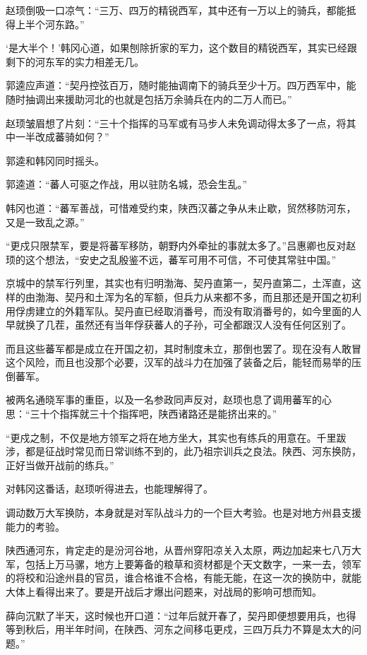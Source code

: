 赵顼倒吸一口凉气：“三万、四万的精锐西军，其中还有一万以上的骑兵，都能抵得上半个河东路。”

‘是大半个！’韩冈心道，如果刨除折家的军力，这个数目的精锐西军，其实已经跟剩下的河东军的实力相差无几。

郭逵应声道：“契丹控弦百万，随时能抽调南下的骑兵至少十万。四万西军中，能随时抽调出来援助河北的也就是包括万余骑兵在内的二万人而已。”

赵顼皱眉想了片刻：“三十个指挥的马军或有马步人未免调动得太多了一点，将其中一半改成蕃骑如何？”

郭逵和韩冈同时摇头。

郭逵道：“蕃人可驱之作战，用以驻防名城，恐会生乱。”

韩冈也道：“蕃军善战，可惜难受约束，陕西汉蕃之争从未止歇，贸然移防河东，又是一致乱之源。”

“更戍只限禁军，要是将蕃军移防，朝野内外牵扯的事就太多了。”吕惠卿也反对赵顼的这个想法，“安史之乱殷鉴不远，蕃军可用不可信，不可使其常驻中国。”

京城中的禁军行列里，其实也有归明渤海、契丹直第一，契丹直第二，土浑直，这样的由渤海、契丹和土浑为名的军额，但兵力从来都不多，而且那还是开国之初利用俘虏建立的外籍军队。契丹直已经取消番号，而没有取消番号的，如今里面的人早就换了几茬，虽然还有当年俘获蕃人的子孙，可全都跟汉人没有任何区别了。

而且这些蕃军都是成立在开国之初，其时制度未立，那倒也罢了。现在没有人敢冒这个风险，而且也没那个必要，汉军的战斗力在加强了装备之后，能轻而易举的压倒蕃军。

被两名通晓军事的重臣，以及一名参政同声反对，赵顼也息了调用蕃军的心思：“三十个指挥就三十个指挥吧，陕西诸路还是能挤出来的。”

“更戍之制，不仅是地方领军之将在地方坐大，其实也有练兵的用意在。千里跋涉，都是征战时常见而日常训练不到的，此乃祖宗训兵之良法。陕西、河东换防，正好当做开战前的练兵。”

对韩冈这番话，赵顼听得进去，也能理解得了。

调动数万大军换防，本身就是对军队战斗力的一个巨大考验。也是对地方州县支援能力的考验。

陕西通河东，肯定走的是汾河谷地，从晋州穿阳凉关入太原，两边加起来七八万大军，包括上万马骡，地方上要筹备的粮草和资材都是个天文数字，一来一去，领军的将校和沿途州县的官员，谁合格谁不合格，有能无能，在这一次的换防中，就能大体上看得出来了。要是开战后才爆出问题来，对战局的影响可想而知。

薛向沉默了半天，这时候也开口道：“过年后就开春了，契丹即便想要用兵，也得等到秋后，用半年时间，在陕西、河东之间移屯更戍，三四万兵力不算是太大的问题。”

